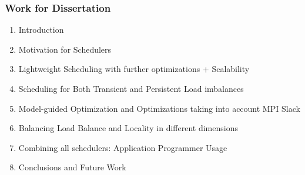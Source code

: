 




\begin{frame}
\frametitle{Work for Dissertation} 

\begin{enumerate}
\item Introduction
\item Motivation for Schedulers
\item Lightweight Scheduling with further optimizations + Scalability  
\item Scheduling for Both Transient and Persistent Load imbalances
\item Model-guided Optimization and Optimizations taking into account MPI Slack
\item Balancing Load Balance and Locality in different dimensions
\item Combining all schedulers: Application Programmer Usage
\item Conclusions and Future Work
\end{enumerate} 
\end{frame} 

